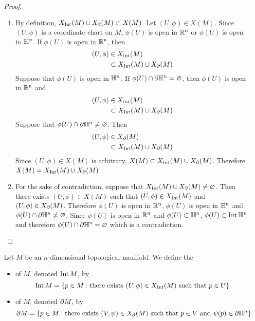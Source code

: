 \documentclass{book}
\begin{document}
	\begin{proof}\
		\begin{enumerate}
			\item By definition, $X_{\operatorname{Int}}(M) \cup X_{\partial}(M) \subset X(M)$. Let $(U, \phi) \in X(M)$. Since $(U, \phi)$ is a coordinate chart on $M$, $\phi(U)$ is open in $\mathbb{R}^n$ or $\phi(U)$ is open in $\mathbb{H}^n$. If $\phi(U)$ is open in $\mathbb{R}^n$, then 
			\begin{align*}
				(U, \phi) 
				& \in X_{\operatorname{Int}}(M) \\
				& \subset X_{\operatorname{Int}}(M) \cup X_{\partial}(M)
			\end{align*}
			Suppose that $\phi(U)$ is open in $\mathbb{H}^n$. If $\phi(U) \cap \partial \mathbb{H}^n = \varnothing$, then $\phi(U)$ is open in $\mathbb{R}^n$ and 
			\begin{align*}
				(U, \phi) 
				& \in X_{\operatorname{Int}}(M) \\
				& \subset X_{\operatorname{Int}}(M) \cup X_{\partial}(M)
			\end{align*}
			Suppose that $\phi(U) \cap \partial \mathbb{H}^n \neq \varnothing$. Then 
			\begin{align*}
				(U, \phi) 
				& \in X_{\partial}(M) \\
				& \subset X_{\operatorname{Int}}(M) \cup X_{\partial}(M)
			\end{align*}
			Since $(U, \phi) \in X(M)$ is arbitrary, $X(M) \subset X_{\operatorname{Int}}(M) \cup X_{\partial}(M)$. Therefore $X(M) = X_{\operatorname{Int}}(M) \cup X_{\partial}(M)$.
			\item For the sake of contradiction, suppose that $X_{\operatorname{Int}}(M) \cup X_{\partial}(M) \neq \varnothing$. Then there exists $(U, \phi) \in X(M)$ such that $(U, \phi) \in X_{\operatorname{Int}}(M)$ and $(U, \phi) \in X_{\partial}(M)$. Therefore $\phi(U)$ is open in $\mathbb{R}^n$, $\phi(U)$ is open in $\mathbb{H}^n$ and $\phi(U) \cap \partial \mathbb{H}^n \neq \varnothing$. Since $\phi(U)$ is open in $\mathbb{R}^n$ and $\phi(U) \subset \mathbb{H}^n$, $\phi(U) \subset \operatorname{Int} \mathbb{H}^n$ and therefore $\phi(U) \cap \partial \mathbb{H}^n = \varnothing$ which is a contradiction.
		\end{enumerate}
	\end{proof}

	\begin{defn} Let $M$ be an $n$-dimensional topological manifold. We define the
		\begin{itemize}
			\item {} of $M$, denoted $\operatorname{Int} M$, by 
			$$\operatorname{Int} M = \{p \in M: \text{there exists $(U, \phi) \in X_{\operatorname{Int}}(M)$ such that $p \in U$}\}$$
			\item \tbf{boundary} of $M$, denoted $\partial M$, by 
			$$\partial M = \{p \in M: \text{there exists $(V, \psi) \in X_{\partial}(M)$ such that $p \in V$ and $\psi(p) \in \partial \mathbb{H}^n$}\}$$
		\end{itemize}
	\end{defn}
\end{document}
